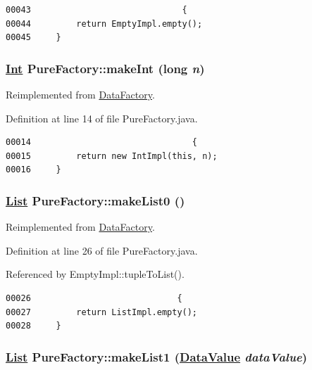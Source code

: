 \footnotesize\begin{verbatim}00043                              {
00044         return EmptyImpl.empty();
00045     }
\end{verbatim}\normalsize 
\hypertarget{classPureFactory_a1}{
\subsubsection[makeInt]{\setlength{\rightskip}{0pt plus 5cm}\hyperlink{interfaceInt}{Int} Pure\-Factory::make\-Int (long {\em n})}}
\label{classPureFactory_a1}




Reimplemented from \hyperlink{interfaceDataFactory_a2}{Data\-Factory}.

Definition at line 14 of file Pure\-Factory.java.\footnotesize\begin{verbatim}00014                                {
00015         return new IntImpl(this, n);
00016     }
\end{verbatim}\normalsize 
\hypertarget{classPureFactory_a5}{
\subsubsection[makeList0]{\setlength{\rightskip}{0pt plus 5cm}\hyperlink{interfaceList}{List} Pure\-Factory::make\-List0 ()}}
\label{classPureFactory_a5}




Reimplemented from \hyperlink{interfaceDataFactory_a7}{Data\-Factory}.

Definition at line 26 of file Pure\-Factory.java.

Referenced by Empty\-Impl::tuple\-To\-List().

\footnotesize\begin{verbatim}00026                             {
00027         return ListImpl.empty();
00028     }
\end{verbatim}\normalsize 
\hypertarget{classPureFactory_a6}{
\subsubsection[makeList1]{\setlength{\rightskip}{0pt plus 5cm}\hyperlink{interfaceList}{List} Pure\-Factory::make\-List1 (\hyperlink{interfaceDataValue}{Data\-Value} {\em data\-Value})}}
\label{classPureFactory_a6}




